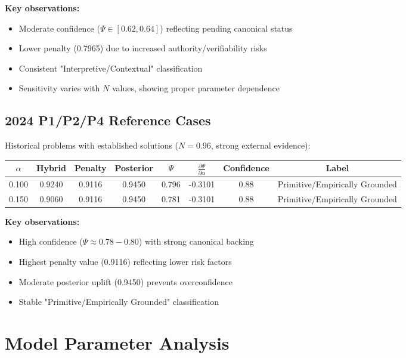\documentclass[12pt,a4paper]{article}
\begin{document}
\textbf{Key observations:}
\begin{itemize}
    \item Moderate confidence ($\Psi \in [0.62, 0.64]$) reflecting pending canonical status
    \item Lower penalty (0.7965) due to increased authority/verifiability risks
    \item Consistent "Interpretive/Contextual" classification
    \item Sensitivity varies with $N$ values, showing proper parameter dependence
\end{itemize}

\subsection{2024 P1/P2/P4 Reference Cases}

Historical problems with established solutions ($N = 0.96$, strong external evidence):

\begin{center}
\begin{tabular}{@{}cccccccc@{}}
\toprule
$\alpha$ & Hybrid & Penalty & Posterior & $\Psi$ & $\frac{\partial \Psi}{\partial \alpha}$ & Confidence & Label \\
\midrule
0.100 & 0.9240 & 0.9116 & 0.9450 & 0.796 & -0.3101 & 0.88 & Primitive/Empirically Grounded \\
0.150 & 0.9060 & 0.9116 & 0.9450 & 0.781 & -0.3101 & 0.88 & Primitive/Empirically Grounded \\
\bottomrule
\end{tabular}
\end{center}

\textbf{Key observations:}
\begin{itemize}
    \item High confidence ($\Psi \approx 0.78-0.80$) with strong canonical backing
    \item Highest penalty value (0.9116) reflecting lower risk factors
    \item Moderate posterior uplift (0.9450) prevents overconfidence
    \item Stable "Primitive/Empirically Grounded" classification
\end{itemize}

\section{Model Parameter Analysis}
\end{document}
